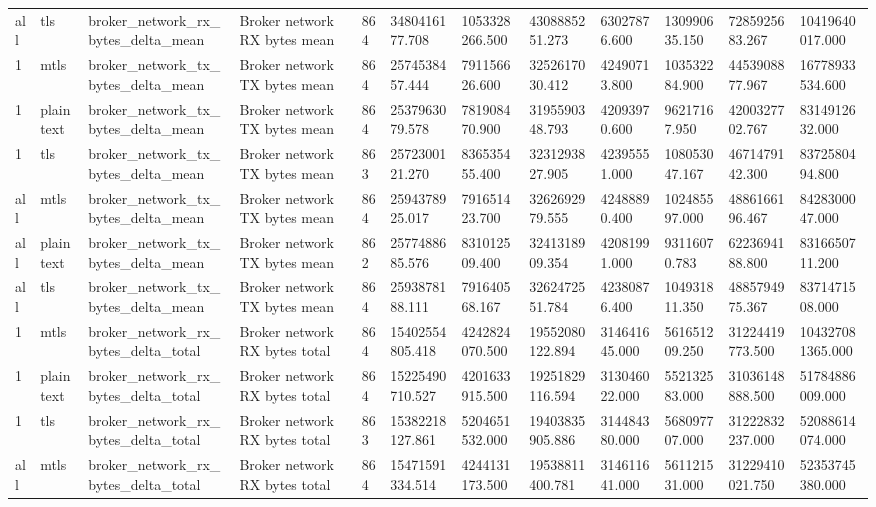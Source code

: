 \begin{longtable}{llllllllllll}
all & tls & broker\_network\_rx\_bytes\_delta\_mean & Broker network RX bytes mean & 864 & 3480416177.708 & 1053328266.500 & 4308885251.273 & 63027876.600 & 130990635.150 & 7285925683.267 & 10419640017.000 \\
1 & mtls & broker\_network\_tx\_bytes\_delta\_mean & Broker network TX bytes mean & 864 & 2574538457.444 & 791156626.600 & 3252617030.412 & 42490713.800 & 103532284.900 & 4453908877.967 & 16778933534.600 \\
1 & plaintext & broker\_network\_tx\_bytes\_delta\_mean & Broker network TX bytes mean & 864 & 2537963079.578 & 781908470.900 & 3195590348.793 & 42093970.600 & 96217167.950 & 4200327702.767 & 8314912632.000 \\
1 & tls & broker\_network\_tx\_bytes\_delta\_mean & Broker network TX bytes mean & 863 & 2572300121.270 & 836535455.400 & 3231293827.905 & 42395551.000 & 108053047.167 & 4671479142.300 & 8372580494.800 \\
all & mtls & broker\_network\_tx\_bytes\_delta\_mean & Broker network TX bytes mean & 864 & 2594378925.017 & 791651423.700 & 3262692979.555 & 42488890.400 & 102485597.000 & 4886166196.467 & 8428300047.000 \\
all & plaintext & broker\_network\_tx\_bytes\_delta\_mean & Broker network TX bytes mean & 862 & 2577488685.576 & 831012509.400 & 3241318909.354 & 42081991.000 & 93116070.783 & 6223694188.800 & 8316650711.200 \\
all & tls & broker\_network\_tx\_bytes\_delta\_mean & Broker network TX bytes mean & 864 & 2593878188.111 & 791640568.167 & 3262472551.784 & 42380876.400 & 104931811.350 & 4885794975.367 & 8371471508.000 \\
1 & mtls & broker\_network\_rx\_bytes\_delta\_total & Broker network RX bytes total & 864 & 15402554805.418 & 4242824070.500 & 19552080122.894 & 314641645.000 & 561651209.250 & 31224419773.500 & 104327081365.000 \\
1 & plaintext & broker\_network\_rx\_bytes\_delta\_total & Broker network RX bytes total & 864 & 15225490710.527 & 4201633915.500 & 19251829116.594 & 313046022.000 & 552132583.000 & 31036148888.500 & 51784886009.000 \\
1 & tls & broker\_network\_rx\_bytes\_delta\_total & Broker network RX bytes total & 863 & 15382218127.861 & 5204651532.000 & 19403835905.886 & 314484380.000 & 568097707.000 & 31222832237.000 & 52088614074.000 \\
all & mtls & broker\_network\_rx\_bytes\_delta\_total & Broker network RX bytes total & 864 & 15471591334.514 & 4244131173.500 & 19538811400.781 & 314611641.000 & 561121531.000 & 31229410021.750 & 52353745380.000 \\

\end{longtable}
